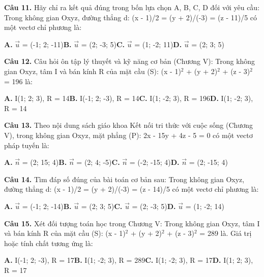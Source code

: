 \documentclass[11pt,a4paper]{article}
\begin{document}
\textbf{\color{primary} Câu 11.} Hãy chỉ ra kết quả đúng trong bốn lựa chọn A, B, C, D đối với yêu cầu: Trong không gian Oxyz, đường thẳng d: (x - 1)/2 = (y + 2)/(-3) = (z - 11)/5 có một vectơ chỉ phương là:\par
\hspace*{1.5em}\textbf{A.} $\vec{u}$ = (-1; 2; -11)\quad\quad \textbf{B.} $\vec{u}$ = (2; -3; 5)\quad\quad \textbf{C.} $\vec{u}$ = (1; -2; 11)\quad\quad \textbf{D.} $\vec{u}$ = (2; 3; 5)\par\vspace{2pt}
\textbf{\color{primary} Câu 12.} Câu hỏi ôn tập lý thuyết và kỹ năng cơ bản (Chương V): Trong không gian Oxyz, tâm I và bán kính R của mặt cầu (S): (x - 1)$^2$ + (y + 2)$^2$ + (z - 3)$^2$ = 196 là:\par
\hspace*{1.5em}\textbf{A.} I(1; 2; 3), R = 14\quad\quad \textbf{B.} I(-1; 2; -3), R = 14\quad\quad \textbf{C.} I(1; -2; 3), R = 196\quad\quad \textbf{D.} I(1; -2; 3), R = 14\par\vspace{2pt}
\textbf{\color{primary} Câu 13.} Theo nội dung sách giáo khoa Kết nối tri thức với cuộc sống (Chương V), trong không gian Oxyz, mặt phẳng (P): 2x - 15y + 4z - 5 = 0 có một vectơ pháp tuyến là:\par
\hspace*{1.5em}\textbf{A.} $\vec{n}$ = (2; 15; 4)\quad\quad \textbf{B.} $\vec{n}$ = (2; 4; -5)\quad\quad \textbf{C.} $\vec{n}$ = (-2; -15; 4)\quad\quad \textbf{D.} $\vec{n}$ = (2; -15; 4)\par\vspace{2pt}
\textbf{\color{primary} Câu 14.} Tìm đáp số đúng của bài toán cơ bản sau: Trong không gian Oxyz, đường thẳng d: (x - 1)/2 = (y + 2)/(-3) = (z - 14)/5 có một vectơ chỉ phương là:\par
\hspace*{1.5em}\textbf{A.} $\vec{u}$ = (-1; 2; -14)\quad\quad \textbf{B.} $\vec{u}$ = (2; 3; 5)\quad\quad \textbf{C.} $\vec{u}$ = (2; -3; 5)\quad\quad \textbf{D.} $\vec{u}$ = (1; -2; 14)\par\vspace{2pt}
\textbf{\color{primary} Câu 15.} Xét đối tượng toán học trong Chương V: Trong không gian Oxyz, tâm I và bán kính R của mặt cầu (S): (x - 1)$^2$ + (y + 2)$^2$ + (z - 3)$^2$ = 289 là. Giá trị hoặc tính chất tương ứng là:\par
\hspace*{1.5em}\textbf{A.} I(-1; 2; -3), R = 17\quad\quad \textbf{B.} I(1; -2; 3), R = 289\quad\quad \textbf{C.} I(1; -2; 3), R = 17\quad\quad \textbf{D.} I(1; 2; 3), R = 17\par\vspace{2pt}
\end{document}
